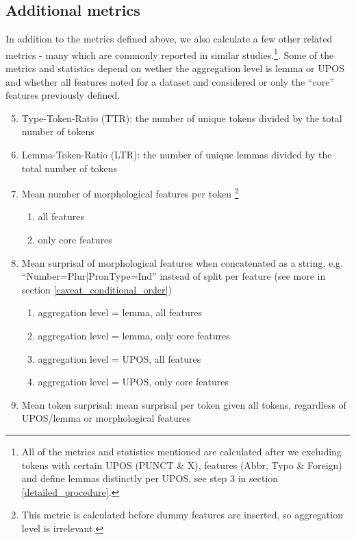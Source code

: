 \documentclass[USenglish]{article}
\begin{document}
\subsection{Additional metrics}
In addition to the metrics defined above, we also calculate a few other related metrics - many which are commonly reported in similar studies.\footnote{All of the metrics and statistics mentioned are calculated after we excluding tokens with certain UPOS (PUNCT \& X), features (Abbr, Typo \& Foreign) and define lemmas distinctly per UPOS, see step 3 in section \ref{detailed_procedure}.}. Some of the metrics and statistics depend on wether the aggregation level is lemma or UPOS and whether all features noted for a dataset and considered or only the ``core'' features previously defined.
\begin{enumerate}
  \setcounter{enumi}{4}  %
  \item Type-Token-Ratio (TTR): the number of unique tokens divided by the total number of tokens
  \item Lemma-Token-Ratio (LTR): the number of unique lemmas divided by the total number of tokens
  \item Mean number of morphological features per token \footnote{This metric is calculated before dummy features are inserted, so aggregation level is irrelevant.}
      \begin{enumerate}
  \renewcommand{\labelenumi}{\alph{enumi})}
  \item all features
  \item only core features
 \end{enumerate}
  \item Mean surprisal of morphological features when concatenated as a string, e.g. ``Number=Plur|PronType=Ind'' instead of split per feature (see more in section \ref{caveat_conditional_order})   
    \begin{enumerate}
    \renewcommand{\labelenumi}{\alph{enumi})}
  \item aggregation level = lemma, all features
  \item aggregation level = lemma, only core features
  \item aggregation level = UPOS, all features
  \item aggregation level = UPOS, only core features
 \end{enumerate}
   \item Mean token surprisal: mean surprisal per token given all tokens, regardless of UPOS/lemma or morphological features
\end{enumerate}
\end{document}

